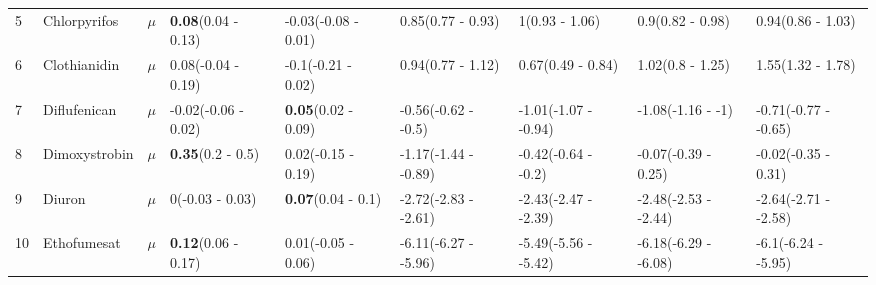 \begin{landscape}
\begin{longtable}{lp{2cm}p{0.6cm}p{1.8cm}p{1.8cm}p{1.8cm}p{1.8cm}p{1.8cm}p{1.8cm}}
  5 & Chlorpyrifos & $\mu$ & \textbf{0.08}\newline (0.04 - 0.13) & -0.03\newline (-0.08 - 0.01) & 0.85\newline (0.77 - 0.93) & 1\newline (0.93 - 1.06) & 0.9\newline (0.82 - 0.98) & 0.94\newline (0.86 - 1.03) \\ 
  6 & Clothianidin & $\mu$ & 0.08\newline (-0.04 - 0.19) & -0.1\newline (-0.21 - 0.02) & 0.94\newline (0.77 - 1.12) & 0.67\newline (0.49 - 0.84) & 1.02\newline (0.8 - 1.25) & 1.55\newline (1.32 - 1.78) \\ 
  7 & Diflufenican & $\mu$ & -0.02\newline (-0.06 - 0.02) & \textbf{0.05}\newline (0.02 - 0.09) & -0.56\newline (-0.62 - -0.5) & -1.01\newline (-1.07 - -0.94) & -1.08\newline (-1.16 - -1) & -0.71\newline (-0.77 - -0.65) \\ 
  8 & Dimoxystrobin & $\mu$ & \textbf{0.35}\newline (0.2 - 0.5) & 0.02\newline (-0.15 - 0.19) & -1.17\newline (-1.44 - -0.89) & -0.42\newline (-0.64 - -0.2) & -0.07\newline (-0.39 - 0.25) & -0.02\newline (-0.35 - 0.31) \\ 
  9 & Diuron & $\mu$ & 0\newline (-0.03 - 0.03) & \textbf{0.07}\newline (0.04 - 0.1) & -2.72\newline (-2.83 - -2.61) & -2.43\newline (-2.47 - -2.39) & -2.48\newline (-2.53 - -2.44) & -2.64\newline (-2.71 - -2.58) \\ 
  10 & Ethofumesat & $\mu$ & \textbf{0.12}\newline (0.06 - 0.17) & 0.01\newline (-0.05 - 0.06) & -6.11\newline (-6.27 - -5.96) & -5.49\newline (-5.56 - -5.42) & -6.18\newline (-6.29 - -6.08) & -6.1\newline (-6.24 - -5.95) \\ 

\end{longtable}
\end{landscape}

